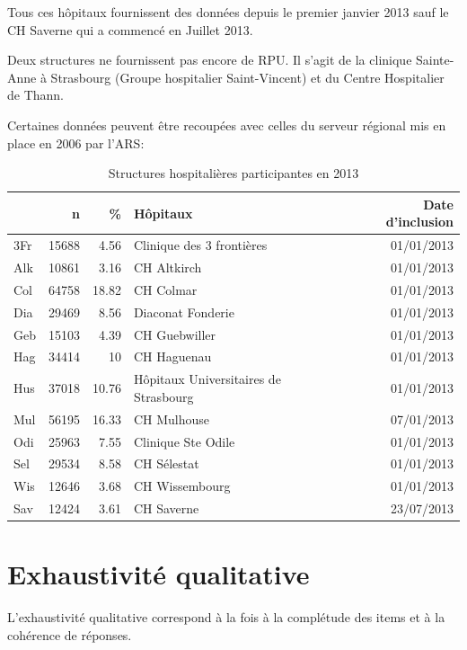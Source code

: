 \documentclass[12pt,english,french,twoside]{book}\usepackage[]{graphicx}\usepackage[]{color}
\begin{document}
Tous ces hôpitaux fournissent des données depuis le premier janvier 2013 sauf le CH Saverne qui a commencé en Juillet 2013.

Deux structures ne fournissent pas encore de RPU. Il s'agit de la clinique Sainte-Anne à Strasbourg (Groupe hospitalier Saint-Vincent) et du Centre Hospitalier de Thann.

Certaines données peuvent être recoupées avec celles du serveur régional mis en place en 2006 par l'ARS: 


\begin{table}[ht]
\centering
\begin{tabular}{|l|r|r|l|r|}
  \hline
 & n & \% & Hôpitaux & Date d'inclusion \\ 
  \hline
3Fr & 15688 & 4.56 & Clinique des 3 frontières & 01/01/2013 \\ 
  Alk & 10861 & 3.16 & CH Altkirch & 01/01/2013 \\ 
  Col & 64758 & 18.82 & CH Colmar & 01/01/2013 \\ 
  Dia & 29469 & 8.56 & Diaconat Fonderie & 01/01/2013 \\ 
  Geb & 15103 & 4.39 & CH Guebwiller & 01/01/2013 \\ 
  Hag & 34414 & 10 & CH Haguenau & 01/01/2013 \\ 
  Hus & 37018 & 10.76 & Hôpitaux Universitaires de Strasbourg & 01/01/2013 \\ 
  Mul & 56195 & 16.33 & CH Mulhouse & 07/01/2013 \\ 
  Odi & 25963 & 7.55 & Clinique Ste Odile & 01/01/2013 \\ 
  Sel & 29534 & 8.58 & CH Sélestat & 01/01/2013 \\ 
  Wis & 12646 & 3.68 & CH Wissembourg & 01/01/2013 \\ 
  Sav & 12424 & 3.61 & CH Saverne & 23/07/2013 \\ 
   \hline
\end{tabular}
\caption{Structures hospitalières participantes en 2013} 
\label{tab1}
\end{table}



\section{Exhaustivité qualitative}

L'exhaustivité qualitative correspond à la fois à la complétude des items et à la cohérence de réponses.
\end{document}

